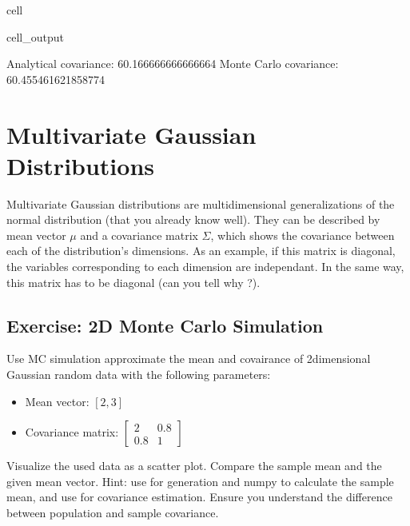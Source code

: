 \documentclass[letterpaper,10pt,english]{jupyterBook}
\begin{document}
\begin{sphinxuseclass}{cell}
\begin{sphinxVerbatimOutput}
\begin{sphinxuseclass}{cell_output}
\begin{sphinxVerbatim}[commandchars=\\\{\}]
Analytical covariance: 60.166666666666664
Monte Carlo covariance: 60.455461621858774
\end{sphinxVerbatim}

\end{sphinxuseclass}\end{sphinxVerbatimOutput}

\end{sphinxuseclass}

\section{Multivariate Gaussian Distributions}
\label{\detokenize{01:multivariate-gaussian-distributions}}
\sphinxAtStartPar
Multivariate Gaussian distributions are multidimensional generalizations of the normal distribution (that you already know well).
They can be described by mean vector \(\mu\) and a covariance matrix \(\Sigma\), which shows the covariance between each of the distribution’s dimensions. As an example, if this matrix is diagonal, the variables corresponding to each dimension are independant. In the same way, this matrix has to be diagonal (can you tell why ?).


\subsection{Exercise: 2D Monte Carlo Simulation}
\label{\detokenize{01:exercise-2d-monte-carlo-simulation}}
\sphinxAtStartPar
Use MC simulation approximate the mean and covairance of 2\sphinxhyphen{}dimensional Gaussian random data with the following parameters:
\begin{itemize}
\item {} 
\sphinxAtStartPar
Mean vector: \([2, 3]\)

\item {} 
\sphinxAtStartPar
Covariance matrix: \(\begin{bmatrix}2&0.8\\0.8&1\end{bmatrix}\)

\end{itemize}

\sphinxAtStartPar
Visualize the used data as a scatter plot. Compare the sample mean and the given mean vector.
Hint: use  for generation and numpy to calculate the sample mean, and use  for covariance estimation.
Ensure you understand the difference between population and sample covariance.
\end{document}
